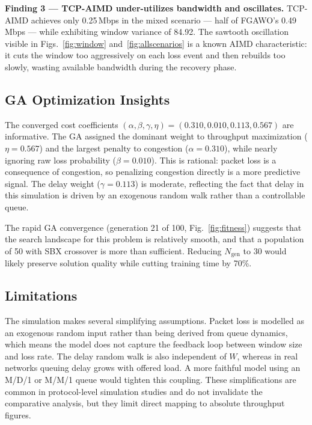 \documentclass[10pt, twocolumn]{IEEEtran}
\theoremstyle{definition}
\begin{document}
\textbf{Finding 3 — TCP-AIMD under-utilizes bandwidth and oscillates.} TCP-AIMD achieves only 0.25\,Mbps in the mixed scenario — half of FGAWO's 0.49\,Mbps — while exhibiting window variance of 84.92. The sawtooth oscillation visible in Figs.~\ref{fig:window} and~\ref{fig:allscenarios} is a known AIMD characteristic: it cuts the window too aggressively on each loss event and then rebuilds too slowly, wasting available bandwidth during the recovery phase.

\subsection{GA Optimization Insights}

The converged cost coefficients $(\alpha, \beta, \gamma, \eta) = (0.310, 0.010, 0.113, 0.567)$ are informative. The GA assigned the dominant weight to throughput maximization ($\eta = 0.567$) and the largest penalty to congestion ($\alpha = 0.310$), while nearly ignoring raw loss probability ($\beta = 0.010$). This is rational: packet loss is a consequence of congestion, so penalizing congestion directly is a more predictive signal. The delay weight ($\gamma = 0.113$) is moderate, reflecting the fact that delay in this simulation is driven by an exogenous random walk rather than a controllable queue.

The rapid GA convergence (generation 21 of 100, Fig.~\ref{fig:fitness}) suggests that the search landscape for this problem is relatively smooth, and that a population of 50 with SBX crossover is more than sufficient. Reducing $N_{\text{gen}}$ to 30 would likely preserve solution quality while cutting training time by 70\%.

\subsection{Limitations}

The simulation makes several simplifying assumptions. Packet loss is modelled as an exogenous random input rather than being derived from queue dynamics, which means the model does not capture the feedback loop between window size and loss rate. The delay random walk is also independent of $W$, whereas in real networks queuing delay grows with offered load. A more faithful model using an M/D/1 or M/M/1 queue would tighten this coupling. These simplifications are common in protocol-level simulation studies and do not invalidate the comparative analysis, but they limit direct mapping to absolute throughput figures.
\end{document}
